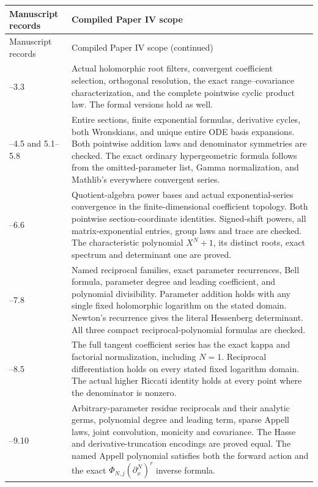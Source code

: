 \documentclass[11pt,letterpaper]{article}
\theoremstyle{definition}
\theoremstyle{remark}
\begin{document}
\begingroup
\small
\begin{longtable}{@{}>{\raggedright\arraybackslash}p{}>{\raggedright\arraybackslash}p{}@{}}
\toprule
Manuscript records & Compiled Paper IV scope \\
\midrule
\endfirsthead
\toprule
Manuscript records & Compiled Paper IV scope (continued) \\
\midrule
\endhead
3.1--3.3 & Actual holomorphic root filters, convergent coefficient
selection, orthogonal resolution, the exact range--covariance characterization,
and the complete pointwise cyclic product law. The formal versions hold as well. \\
4.1--4.5 and 5.1--5.8 & Entire sections, finite exponential formulas,
derivative cycles, both Wronskians, and unique entire ODE basis expansions.
Both pointwise addition laws and denominator symmetries are checked.
The exact ordinary hypergeometric formula follows from the omitted-parameter
list, Gamma normalization, and Mathlib's everywhere convergent series. \\
6.1--6.6 & Quotient-algebra power bases and actual exponential-series
convergence in the finite-dimensional coefficient topology. Both pointwise
section-coordinate identities. Signed-shift powers, all matrix-exponential
entries, group laws and trace are checked. The characteristic polynomial
$X^N+1$, its distinct roots, exact spectrum and determinant one are proved. \\
7.1--7.8 & Named reciprocal families, exact parameter recurrences, Bell
formula, parameter degree and leading coefficient, and polynomial divisibility.
Parameter addition holds with any single fixed holomorphic logarithm on the
stated domain. Newton's recurrence gives the literal Hessenberg determinant.
All three compact reciprocal-polynomial formulas are checked. \\
8.1--8.5 & The full tangent coefficient series has the exact kappa and
factorial normalization, including $N=1$. Reciprocal differentiation holds on
every stated fixed logarithm domain. The actual higher Riccati identity holds
at every point where the denominator is nonzero. \\
9.1--9.10 & Arbitrary-parameter residue reciprocals and their analytic germs,
polynomial degree and leading term, sparse Appell laws, joint convolution,
monicity and covariance. The Hasse and derivative-truncation encodings are
proved equal. The named Appell polynomial satisfies both the forward action
and the exact $\Phi_{N,j}(\partial_x^N)^r$ inverse formula. \\

\end{longtable}
\end{document}
